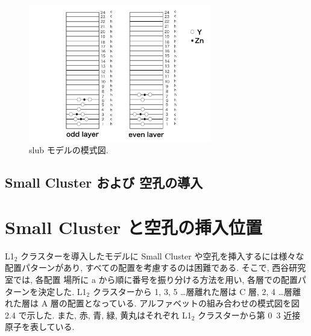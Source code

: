 \begin{figure}[htbp]
	\begin{center}
		\includegraphics[width=80mm]{../method/small_cluster_slab.png}
		\caption{slub モデルの模式図.}
		\label{default}
	\end{center}
\end{figure}


\subsection{ Small Cluster および 空孔の導入}


\section{Small Cluster と空孔の挿入位置}
L1$_2$ クラスターを導入したモデルに Small Cluster や空孔を挿入するには様々な配置パターンがあり, すべての配置を考慮するのは困難である. そこで, 西谷研究室では, 各配置 場所に a から順に番号を振り分ける方法を用い, 各層での配置パターンを決定した. L1$_2$ クラスターから 1, 3, 5 …層離れた層は C 層, 2, 4 …層離れた層は A 層の配置となっている. アルファベットの組み合わせの模式図を図 2.4 で示した. また, 赤, 青, 緑, 黄丸はそれぞれ L1$_2$ クラスターから第 0~3 近接原子を表している.

